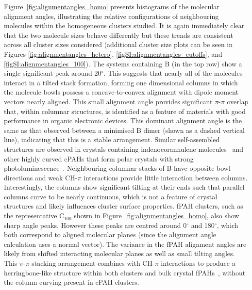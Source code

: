 Figure~\ref{fig:alignmentangles_homo} presents histograms of the molecular alignment angles, illustrating the relative configurations of neighbouring molecules within the homogeneous clusters studied. It is again immediately clear that the two molecule sizes behave differently but these trends are consistent across all cluster sizes considered (additional cluster size plots can be seen in Figures \ref{fig:alignmentangles_hetero}, \ref{figSI:alignmentangles_cutoffs}, and \ref{figSI:alignmentangles_100}). The systems containing B (in the top row) show a single significant peak around 20$^{\circ}$.  This suggests that nearly all of the molecules interact in a tilted stack formation, forming one dimensional columns in which the molecule bowls possess a concave-to-convex alignment with dipole moment vectors nearly aligned. This small alignment angle provides significant $\pi$-$\pi$ overlap that, within columnar structures, is identified as a feature of materials with good performance in organic electronic devices. This dominant alignment angle is the same as that observed between a minimised B dimer (shown as a dashed vertical line), indicating that this is a stable arrangement.  Similar self-assembled structures are observed in crystals containing indenocorannulene molecules~\cite{Filatov2010} and other highly curved cPAHs that form polar crystals with strong photoluminescence~\cite{chen2014highly}. Neighbouring columnar stacks of B have opposite bowl directions and weak CH-$\pi$ interactions provide little interaction between columns. Interestingly, the columns show significant tilting at their ends such that parallel columns curve to be nearly continuous, which is not a feature of crystal structures and likely influences cluster surface properties. fPAH clusters, such as the representative $\text{C}_{\text{100}}$ shown in Figure~\ref{fig:alignmentangles_homo}, also show sharp angle peaks. However these peaks are centred around 0$^{\circ}$ and 180$^{\circ}$, which both correspond to aligned molecular planes (since the alignment angle calculation uses a normal vector). The variance in the fPAH alignment angles are likely from shifted interacting molecular planes as well as small tilting angles.
This $\pi$-$\pi$ stacking arrangement combines with CH-$\pi$ interactions to produce a herringbone-like structure within both clusters and bulk crystal fPAHs~\cite{Khanna200567}, without the column curving present in cPAH clusters. 


